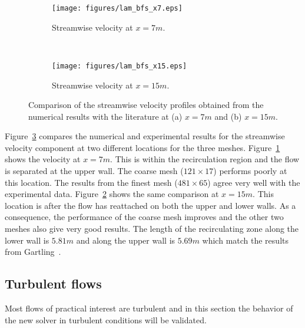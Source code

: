\begin{figure}[h!]
    \centering
    \captionsetup{justification=centering}
    \begin{subfigure}[b]{0.48\textwidth}
    \captionsetup{justification=centering}
        \texttt{[image: figures/lam\_bfs\_x7.eps]}
        \caption{Streamwise velocity at $x=7m$.}
        \label{fig:bfsx7}
    \end{subfigure}
    ~ %
    \begin{subfigure}[b]{0.48\textwidth}
    \centering
    \captionsetup{justification=centering}
        \texttt{[image: figures/lam\_bfs\_x15.eps]}
        \caption{Streamwise velocity at $x=15m$.}
        \label{fig:bfsx15}
    \end{subfigure}
    \caption{Comparison of the streamwise velocity profiles obtained from the numerical results with the literature at (a) $x=7m$ and (b) $x=15m$.}
    \label{fig:bfsvel}
\end{figure}
Figure~\ref{fig:bfsvel} compares the numerical and experimental results for the streamwise velocity component at two different locations for the three meshes.  Figure~\ref{fig:bfsx7} shows the velocity at $x=7m$. This is within the recirculation region and the flow is separated at the upper wall. The coarse mesh ($121\times17$) performs poorly at this location. The results from the finest mesh ($481\times65$) agree very well with the experimental data. Figure~\ref{fig:bfsx15} shows the same comparison at $x=15m$. This location is after the flow has reattached on both the upper and lower walls. As a consequence, the performance of the coarse mesh improves and the other two meshes also give very good results. The length of the recirculating zone along the lower wall is $5.81m$ and along the upper wall is $5.69m$ which match the results from Gartling~\cite{gartling4}.


\subsection{Turbulent flows}\label{ssec:turbprofile}
Most flows of practical interest are turbulent and in this section the behavior of the new solver in turbulent conditions will be validated.
